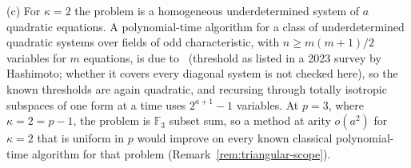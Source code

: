 \begin{remark}
\textup{(c)} For $\kappa=2$ the problem is a homogeneous underdetermined system of $a$ quadratic equations. A polynomial-time algorithm for a class of underdetermined quadratic systems over fields of odd characteristic, with $n\ge m(m+1)/2$ variables for $m$ equations, is due to~\cite{ChengHashimotoMiuraTakagi2014} (threshold as listed in a 2023 survey by Hashimoto; whether it covers every diagonal system is not checked here), so the known thresholds are again quadratic, and recursing through totally isotropic subspaces of one form at a time uses $2^{a+1}-1$ variables. At $p=3$, where $\kappa=2=p-1$, the problem is $\mathbb{F}_3$ subset sum, so a method at arity $o(a^2)$ for $\kappa=2$ that is uniform in $p$ would improve on every known classical polynomial-time algorithm for that problem (Remark~\ref{rem:triangular-scope}).
\end{remark}

